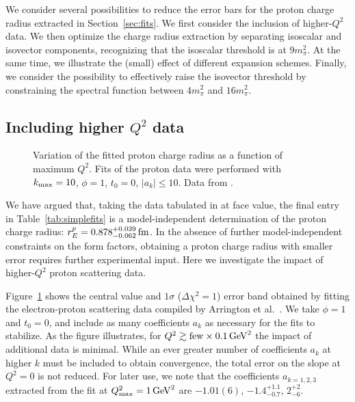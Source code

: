 \documentclass[12pt]{article}
\begin{document}
We consider several possibilities to reduce the error bars for the proton 
charge radius extracted in Section~\ref{sec:fits}.   We first consider the inclusion 
of higher-$Q^2$ data. 
We then optimize the charge radius extraction by separating 
isoscalar and isovector components, recognizing that the isoscalar threshold is at $9m_\pi^2$. 
At the same time, we illustrate the (small) effect of different expansion schemes.
Finally, we consider the possibility to effectively raise 
the isovector threshold by constraining the spectral function between $4 m_\pi^2$ and $16 m_\pi^2$. 

\subsection{Including higher $Q^2$ data} 

\begin{figure}[ht]
\begin{center}
\caption{\label{fig:Q2} Variation of the fitted proton charge radius as a function of 
maximum $Q^2$.  Fits of the proton data were performed with $k_{\rm max}=10$, $\phi=1$, 
$t_0=0$, $|a_k|\le 10$.   
Data from \cite{Arrington:2007ux}.
}
\end{center}
\end{figure}  


We have argued that, taking the data tabulated in 
\cite{Rosenfelder:1999cd} at face value, the 
final entry in Table~\ref{tab:simplefits} is a model-independent determination of the 
proton charge radius: $r_E^p =  0.878^{+0.039}_{-0.062}\,{\rm fm}$. 
In the absence of further model-independent constraints on the form factors, 
obtaining a proton charge radius with smaller error requires further 
experimental input.   Here we investigate the impact of higher-$Q^2$ proton 
scattering data.  

Figure~\ref{fig:Q2} shows the central value and $1\sigma$ ($\Delta \chi^2=1$) 
error band obtained by fitting the electron-proton scattering 
data compiled by Arrington et al.~\cite{Arrington:2007ux}.  
We take $\phi=1$ and $t_0=0$, and include as many coefficients $a_k$ as necessary 
for the fits to stabilize.  
As the figure illustrates, for $Q^2\gtrsim {\rm few} \times 0.1\,{\rm GeV}^2$ the
impact of additional data is minimal.   While an ever greater number of 
coefficients $a_k$ at higher $k$ must be included to obtain convergence, the 
total error on the slope at $Q^2=0$ is not reduced.   
For later use, we note that the coefficients $a_{k=1,2,3}$ 
extracted from the fit at $Q^2_{\rm max}=1\,{\rm GeV}^2$ are
$-1.01(6)$, $-1.4^{+1.1}_{-0.7}$, $2^{+2}_{-6}$.   
\end{document}
